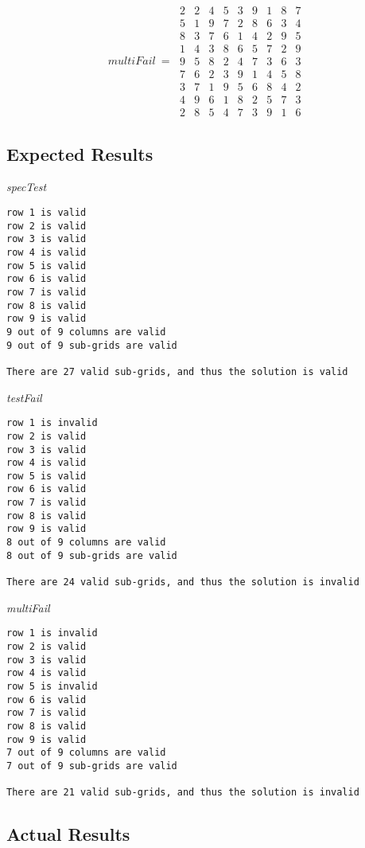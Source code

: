 \documentclass[]{article}
\begin{document}
$$
multiFail\ =\  
\begin{matrix}
2 & 2 & 4 & 5 & 3 & 9 & 1 & 8 & 7 \\
5 & 1 & 9 & 7 & 2 & 8 & 6 & 3 & 4 \\
8 & 3 & 7 & 6 & 1 & 4 & 2 & 9 & 5 \\
1 & 4 & 3 & 8 & 6 & 5 & 7 & 2 & 9 \\
9 & 5 & 8 & 2 & 4 & 7 & 3 & 6 & 3 \\ 
7 & 6 & 2 & 3 & 9 & 1 & 4 & 5 & 8 \\
3 & 7 & 1 & 9 & 5 & 6 & 8 & 4 & 2 \\
4 & 9 & 6 & 1 & 8 & 2 & 5 & 7 & 3 \\
2 & 8 & 5 & 4 & 7 & 3 & 9 & 1 & 6

\end{matrix}
$$

\break
\subsection{Expected Results}
\textit{specTest}

\begin{lstlisting}
row 1 is valid
row 2 is valid
row 3 is valid
row 4 is valid
row 5 is valid
row 6 is valid
row 7 is valid
row 8 is valid
row 9 is valid
9 out of 9 columns are valid
9 out of 9 sub-grids are valid

There are 27 valid sub-grids, and thus the solution is valid
\end{lstlisting}
\vspace{1cm}
\textit{testFail}
\begin{lstlisting}
row 1 is invalid
row 2 is valid
row 3 is valid
row 4 is valid
row 5 is valid
row 6 is valid
row 7 is valid
row 8 is valid
row 9 is valid
8 out of 9 columns are valid
8 out of 9 sub-grids are valid

There are 24 valid sub-grids, and thus the solution is invalid
\end{lstlisting}

\vspace{1cm}
\textit{multiFail}
\begin{lstlisting}
row 1 is invalid
row 2 is valid
row 3 is valid
row 4 is valid
row 5 is invalid
row 6 is valid
row 7 is valid
row 8 is valid
row 9 is valid
7 out of 9 columns are valid
7 out of 9 sub-grids are valid

There are 21 valid sub-grids, and thus the solution is invalid
\end{lstlisting}
\subsection{Actual Results}
\pagebreak
\end{document}
